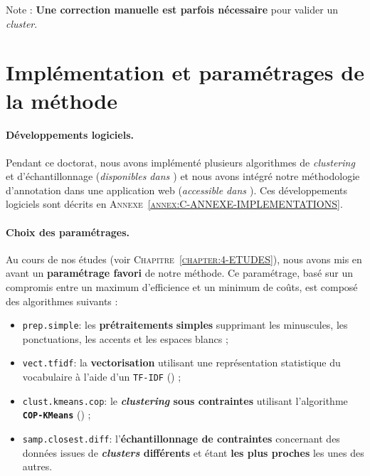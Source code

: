 			Note : \textbf{Une correction manuelle est parfois nécessaire} pour valider un \textit{cluster}.
	
	
	\newpage
	\section{Implémentation et paramétrages de la méthode}
		\label{section:5.4-GUIDE-PARAMETRAGES}
		
		\paragraph{\textcolor{colorSilverLakeBlue}{\faCheckSquare} Développements logiciels.}
		
			Pendant ce doctorat, nous avons implémenté plusieurs algorithmes de \textit{clustering} et d'échantillonnage (\textit{disponibles dans \cite{schild:2022:cognitivefactory-interactiveclustering}}) et nous avons intégré notre méthodologie d'annotation dans une application web (\textit{accessible dans \cite{schild-etal:2022:cognitivefactory-interactiveclusteringgui}}).
			Ces développements logiciels sont décrits en \textsc{Annexe~\ref{annex:C-ANNEXE-IMPLEMENTATIONS}}.
		
		\paragraph{\textcolor{colorSilverLakeBlue}{\faCheckSquare} Choix des paramétrages.}
		
			Au cours de nos études (voir \textsc{Chapitre~\ref{chapter:4-ETUDES}}), nous avons mis en avant un \textbf{paramétrage favori} de notre méthode.
			Ce paramétrage, basé sur un compromis entre un maximum d'efficience et un minimum de coûts, est composé des algorithmes suivants :
			
			\begin{itemize}
				\item \texttt{prep.simple}: les \textbf{prétraitements} \textbf{simples} supprimant les minuscules, les ponctuations, les accents et les espaces blancs ;
				\item \texttt{vect.tfidf}: la \textbf{vectorisation} utilisant une représentation statistique du vocabulaire à l'aide d'un \texttt{TF-IDF} (\cite{ramos:2003:using-tfidf-determine}) ;
				\item \texttt{clust.kmeans.cop}: le \textbf{\textit{clustering} sous contraintes} utilisant l'algorithme \textbf{\texttt{COP-KMeans}} (\cite{wagstaff-etal:2001:constrained-kmeans-clustering}) ;
				\item \texttt{samp.closest.diff}: l'\textbf{échantillonnage de contraintes} concernant des données issues de \textbf{\textit{clusters} différents} et étant \textbf{les plus proches} les unes des autres.
			\end{itemize}
		
